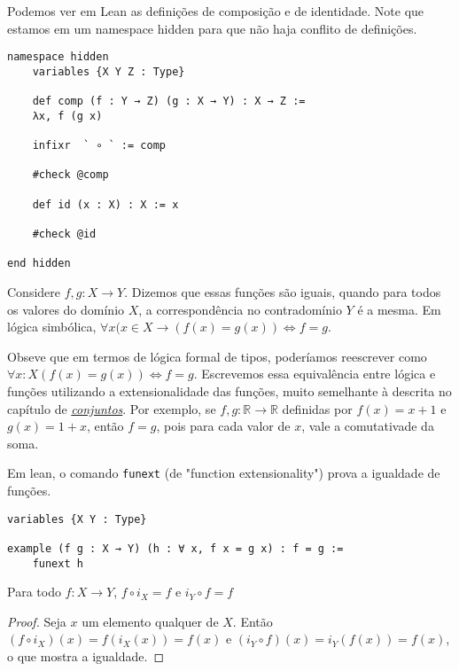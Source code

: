 Podemos ver em Lean as definições de composição e de identidade. Note que estamos em um namespace
hidden para que não haja conflito de definições.

\begin{lstlisting}
namespace hidden
    variables {X Y Z : Type}

    def comp (f : Y → Z) (g : X → Y) : X → Z :=
    λx, f (g x)

    infixr  ` ∘ ` := comp

    #check @comp

    def id (x : X) : X := x

    #check @id

end hidden
\end{lstlisting}

\begin{definition}
    \label{def3}
    Considere $f,g : X \to Y$. Dizemos que essas funções são iguais,
    quando para todos os valores do domínio $X$, a correspondência no contradomínio $Y$ é a
    mesma. Em lógica simbólica, $\forall x (x \in X \to (f(x) = g(x)) \iff f = g $.
\end{definition}

Obseve que em termos de lógica formal de tipos, poderíamos reescrever como
$\forall x : X (f(x) = g(x)) \iff f = g$. Escrevemos essa equivalência entre lógica e funções
utilizando a extensionalidade das funções, muito semelhante à descrita no capítulo de
\textit{\hyperlink{chapter.5}{conjuntos}}. Por exemplo, se $f, g : \mathbb{R} \to \mathbb{R}$
definidas por $f(x) = x + 1$ e $g(x) = 1 + x$, então $f = g$, pois para cada valor de $x$, vale
a comutativade da soma.

Em lean, o comando \lstinline{funext} (de "function extensionality") prova a igualdade de funções.

\begin{lstlisting}
variables {X Y : Type}

example (f g : X → Y) (h : ∀ x, f x = g x) : f = g :=
    funext h
\end{lstlisting}

\begin{theorem}
    \label{prop1}
    Para todo $f: X \to Y$, $f \circ i_X = f$ e $i_Y \circ f = f$
\end{theorem}
\begin{proof}
    Seja $x$ um elemento qualquer de $X$. Então $(f \circ i_X)(x) = f(i_X(x)) = f(x)$
     e $(i_Y \circ f)(x) = i_Y(f(x)) = f(x)$, o que mostra a igualdade.
\end{proof}

